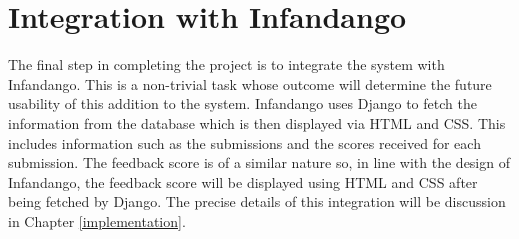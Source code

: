 \section{Integration with Infandango}
The final step in completing the project is to integrate the system with Infandango. This is a non-trivial task whose outcome will determine the future usability of this addition to the system. Infandango uses Django\cite{django_site} to fetch the information from the database which is then displayed via HTML and CSS. This includes information such as the submissions and the scores received for each submission. The feedback score is of a similar nature so, in line with the design of Infandango, the feedback score will be displayed using HTML and CSS after being fetched by Django. The precise details of this integration will be discussion in Chapter \ref{implementation}.
